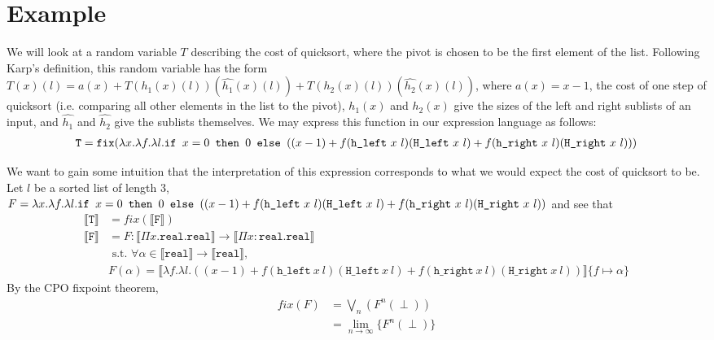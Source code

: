 \section{Example}
We will look at a random variable $T$ describing the cost of quicksort, where the pivot is chosen to be the first element 
of the list. Following Karp's definition, this random variable has the form $T(x)(l) = a(x) + T(h_1(x)(l))(\hat{h_1}(x)(l))
+ T(h_2(x)(l))(\hat{h_2}(x)(l))$, where $a(x) = x-1$, the cost of one step of quicksort (i.e. comparing all other elements
in the list to the pivot), $h_1(x)$ and $h_2(x)$ give the sizes of the left and right sublists of an input, and
$\hat{h_1}$ and $\hat{h_2}$ give the sublists themselves. We may express this function in our expression language
as follows:
\begin{align*}
\texttt{T} = \texttt{fix}(\lambda x. \lambda f. \lambda l. \texttt{if } x=0 \texttt{ then } 0 \texttt{ else } ((x-1) 
		+ f(\texttt{h\_left} \ x \ l)(\texttt{H\_left} \ x \ l) + f(\texttt{h\_right} \ x \ l)(\texttt{H\_right} \ x \ l)))
\end{align*}
 
 We want to gain some intuition that the interpretation of this expression corresponds to what we would expect
 the cost of quicksort to be. Let $l$ be a sorted list of length $3$, $F = \lambda x. \lambda f. \lambda l. \texttt{if } x = 0 \texttt{ then } 0 \texttt{ else } ((x-1) + f(\texttt{h\_left} \ x \ l)(\texttt{H\_left} \ x \ l) + f(\texttt{h\_right} \ x \ l)(\texttt{H\_right} \ x \ l))$  and see that
 \begin{align*}
 \llbracket \texttt{T} \rrbracket &= fix(\llbracket \texttt{F} \rrbracket) \\
 \llbracket \texttt{F} \rrbracket &= F : \llbracket \Pi x.\texttt{real}.\texttt{real}\rrbracket \rightarrow \llbracket \Pi x:\texttt{real} . \texttt{real}\rrbracket \\ 
 &\text{ s.t. } \forall \alpha \in \llbracket \texttt{real}\rrbracket \rightarrow \llbracket \texttt{real} \rrbracket, \\   
 &F(\alpha) = \llbracket\lambda f. \lambda l. ((x-1) 
		+ f(\texttt{h\_left} \ x \ l)(\texttt{H\_left} \ x \ l) + f(\texttt{h\_right} \ x \ l)(\texttt{H\_right} \ x \ l))\rrbracket\{f \mapsto \alpha\} 
 \end{align*}
 By the CPO fixpoint theorem,  
\begin{align*}
 fix(F) &= \bigvee_n(F^n (\perp)) \\
&= \lim_{n \to \infty}\{F^n (\perp)\}
 \end{align*}
 
 
 
 